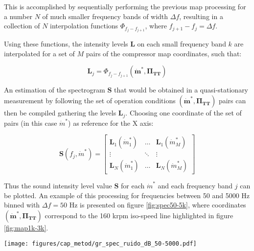 This is accomplished by sequentially performing the previous map processing for a number $N$ of much smaller frequency bands of width $\Delta f$, resulting in a collection of $N$ interpolation functions $\Phi_{f_j-f_{j+1}}$, where $f_{j+1}-f_j = \Delta f$.

Using these functions, the intensity levels $\mathbf L$ on each small frequency band $k$ are interpolated for a set of $M$ pairs of the compressor map coordinates, such that:

\begin{equation}
 \mathbf L_j=\Phi_{f_j-f_{j+1}}(\bm{\dot m^*},\bm{\Pi_\text{TT}})
\end{equation}

An estimation of the spectrogram $\mathbf S$ that would be obtained in a quasi-stationary measurement by following the set of operation conditions $(\bm{\dot m^*},\bm{\Pi_\text{TT}})$ pairs can then be compiled gathering the levels $\mathbf L_j$. Choosing one coordinate of the set of pairs (in this case $\dot m^*$) as reference for the X axis:

\begin{equation}
  \mathbf S(f_j,\dot m^*)=\begin{bmatrix}
    \mathbf L_1(\dot m^*_1) & \hdots & \mathbf L_1(\dot m^*_M)\\
    \vdots & \ddots & \vdots \\
    \mathbf L_N(\dot m^*_1) & \hdots & \mathbf L_N(\dot m^*_M)
  \end{bmatrix}
\end{equation}

Thus the sound intensity level value $\mathbf S$ for each $\dot m^*$ and each frequency band $j$ can be plotted. An example of this processing for frequencies between 50 and 5000 Hz binned with $\Delta f = 50$ Hz is presented on figure \ref{fig:spec50-5k}, where coordinates $(\bm{\dot{m}^*},\bm{\Pi_\text{TT}})$ correspond to the 160 krpm iso-speed line highlighted in figure \ref{fig:map1k-3k}.

\begin{figure*}[t!]
\centering
\texttt{[image: figures/cap\_metod/gr\_spec\_ruido\_dB\_50-5000.pdf]}
\caption{Sample of spectrograms calculated using the procedure outlined in subsection \ref{sub:noise_maps_and_spectrograms}, following the 160 krpm paths marked in figure \ref{fig:map1k-3k}. The 1--3 kHz band selected for the maps in figure \ref{fig:map1k-3k} is highlighted, along with some particular flow phenomena discussed in section \ref{sec:results_and_discussion}.}
\label{fig:spec50-5k}
\end{figure*}

